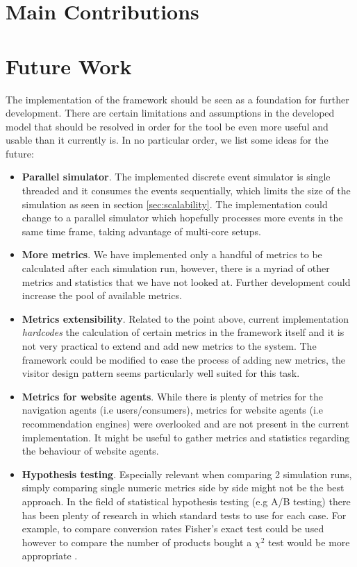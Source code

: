 \section{Main Contributions}

\section{Future Work}

The implementation of the framework should be seen as a foundation for further 
development. There are certain limitations and assumptions in the developed 
model that should be resolved in order for the tool be even more useful and 
usable than it currently is. In no particular order, we list some ideas for the 
future:

\begin{itemize}
    \item \textbf{Parallel simulator}. The implemented discrete event simulator 
    is single threaded and it consumes the events sequentially, which limits 
    the size of the simulation as seen in section \ref{sec:scalability}. The 
    implementation could change to a parallel simulator which hopefully 
    processes more events in the same time frame, taking advantage of 
    multi-core setups.
    
    \item \textbf{More metrics}. We have implemented only a handful of metrics 
    to be calculated after each simulation run, however, there is a myriad of 
    other metrics and statistics that we have not looked at. Further 
    development could increase the pool of available metrics.
    
    \item \textbf{Metrics extensibility}. Related to the point above, current 
    implementation \textit{hardcodes} the calculation of certain metrics in the 
    framework itself and it is not very practical to extend and add new metrics 
    to the system. The framework could be modified to ease the process of 
    adding new metrics, the visitor design pattern\cite{gamma1995design} seems 
    particularly well suited for this task.
    
    \item \textbf{Metrics for website agents}. While there is plenty of metrics 
    for the navigation agents (i.e users/consumers), metrics for website agents 
    (i.e recommendation engines) were overlooked and are not present in the 
    current implementation. It might be useful to gather metrics and statistics 
    regarding the behaviour of website agents.
    
    \item \textbf{Hypothesis testing}. Especially relevant when comparing 2 
    simulation runs, simply comparing single numeric metrics side by side might 
    not be the best approach. In the field of statistical hypothesis testing 
    (e.g A/B testing) there has been plenty of research in which standard tests 
    to use for each case. For example, to compare conversion rates Fisher's 
    exact test could be used however to compare the number of products bought a 
    $\chi^2$ test would be more appropriate \cite{wikiab}.
\end{itemize}

